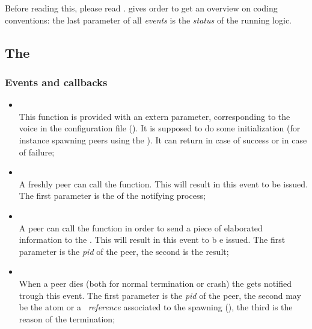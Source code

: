 Before reading this, please read .
 gives order to get an overview on
coding conventions: the last parameter of all \emph{events} is the
\emph{status} of the running logic.

\subsection{The  }

    \subsubsection{Events and callbacks}

        \begin{itemize}
        \item {} \\
            This function is provided with an extern parameter,
            corresponding to the  voice in the
            configuration file ().
            It is supposed to do some initialization (for instance
            spawning peers using the ).
            It can return  in case of success or
             in case of failure;

        \item {} \\
            A freshly peer can call the 
            function. This will result in this event to be issued. The
            first parameter is the  of the notifying process;

        \item {} \\
            A peer can call the 
            function in order to send a piece of elaborated information to
            the . This will result in this event to b e
            issued. The first parameter is the \emph{pid} of the
            peer, the second is the result;

        \item {} \\
            When a peer dies (both for normal termination or crash) the
             gets notified trough this event. The first
            parameter is the \emph{pid} of the peer, the second may be the
             atom or a \emph{\Erlang\ reference}
            associated to the spawning (), the
            third is the reason of the termination;


\end{itemize}
